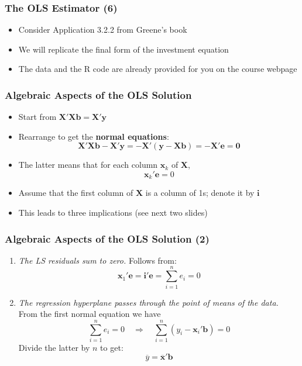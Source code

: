 \documentclass[10pt]{beamer}
\theoremstyle{definition}
\begin{document}
\begin{frame}[fragile]
\frametitle{The OLS Estimator (6)}
\begin{itemize}
	\item Consider Application 3.2.2 from Greene's book
	\item We will replicate the final form of the investment equation
	\item The data and the R code are already provided for you on the course webpage
\end{itemize}
\end{frame}

\begin{frame}[fragile]
\frametitle{Algebraic Aspects of the OLS Solution}
\begin{itemize}
	\item Start from $\mathbf{X'Xb} = \mathbf{X'y}$
	\item Rearrange to get the \textbf{normal equations}:
	\[
		\mathbf{X'Xb - X'y = -X'(y - Xb) = -X'e = 0}
	\]
	\item The latter means that for each column $\mathbf{x}_{k}$ of $\mathbf{X}$,
	\[
		\mathbf{x}_{k}'\mathbf{e} = 0
	\]
	\item Assume that the first column of $\mathbf{X}$ is a column of 1s; denote it by $\mathbf{i}$
	\item This leads to three implications (see next two slides)
\end{itemize}
\end{frame}

\begin{frame}[fragile]
\frametitle{Algebraic Aspects of the OLS Solution (2)}
\begin{enumerate}
	\item \textit{The LS residuals sum to zero.} Follows from:
	\[
		\mathbf{x}_{1}'\mathbf{e} = \mathbf{i'e} = \sum_{i=1}^{n}e_{i} = 0
	\]
	\item \textit{The regression hyperplane passes through the point of means of the data.} From the first normal equation we have 
	\[
		\sum_{i=1}^{n}e_{i} = 0 \quad \Rightarrow \quad \sum_{i=1}^{n}(y_{i} - \mathbf{x}_{i}'\mathbf{b}) = 0 
	\]
	Divide the latter by $n$ to get:
	\[
		\overline{y} = \overline{\mathbf{x}}'\mathbf{b}
	\]
\end{enumerate}
\end{frame}
\end{document}
